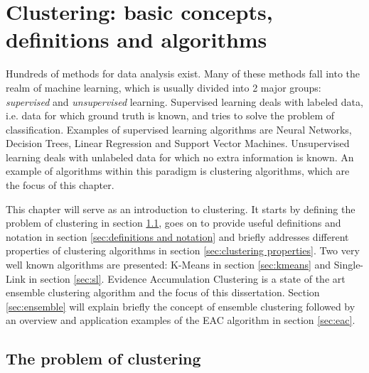 
\chapter{Clustering: basic concepts, definitions and algorithms}
\label{chapter:clustering}

Hundreds of methods for data analysis exist.
Many of these methods fall into the realm of machine learning, which is usually divided into 2 major groups: \textit{supervised} and \textit{unsupervised} learning.
Supervised learning deals with labeled data, i.e. data for which ground truth is known, and tries to solve the problem of classification.
Examples of supervised learning algorithms are Neural Networks, Decision Trees, Linear Regression and Support Vector Machines. %
Unsupervised learning deals with unlabeled data for which no extra information is known.
An example of algorithms within this paradigm is clustering algorithms, which are the focus of this chapter.

This chapter will serve as an introduction to clustering.
It starts by defining the problem of clustering in section \ref{sec:clustering}, goes on to provide useful definitions and notation in section \ref{sec:definitions and notation} and briefly addresses different properties of clustering algorithms in section \ref{sec:clustering properties}.
Two very well known algorithms are presented: K-Means in section \ref{sec:kmeans} and Single-Link in section \ref{sec:sl}.
Evidence Accumulation Clustering is a state of the art ensemble clustering algorithm and the focus of this dissertation.
Section \ref{sec:ensemble} will explain briefly the concept of ensemble clustering followed by an overview and application examples of the EAC algorithm in section \ref{sec:eac}.

\section{The problem of clustering}
\label{sec:clustering}


